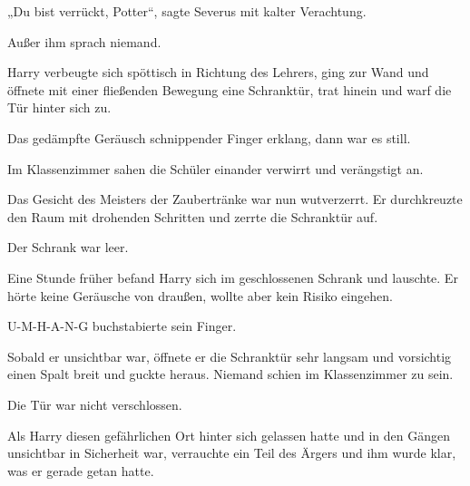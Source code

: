 „Du bist verrückt, Potter“, sagte Severus mit kalter Verachtung.

Außer ihm sprach niemand.

Harry verbeugte sich spöttisch in Richtung des Lehrers, ging zur Wand und öffnete mit einer fließenden Bewegung eine Schranktür, trat hinein und warf die Tür hinter sich zu.

Das gedämpfte Geräusch schnippender Finger erklang, dann war es still.

Im Klassenzimmer sahen die Schüler einander verwirrt und verängstigt an.

Das Gesicht des Meisters der Zaubertränke war nun wutverzerrt. Er durchkreuzte den Raum mit drohenden Schritten und zerrte die Schranktür auf.

Der Schrank war leer.

\later

Eine Stunde früher befand Harry sich im geschlossenen Schrank und lauschte. Er hörte keine Geräusche von draußen, wollte aber kein Risiko eingehen.

U-M-H-A-N-G buchstabierte sein Finger.

Sobald er unsichtbar war, öffnete er die Schranktür sehr langsam und vorsichtig einen Spalt breit und guckte heraus. Niemand schien im Klassenzimmer zu sein.

Die Tür war nicht verschlossen.

Als Harry diesen gefährlichen Ort hinter sich gelassen hatte und in den Gängen unsichtbar in Sicherheit war, verrauchte ein Teil des Ärgers und ihm wurde klar, was er gerade getan hatte.

